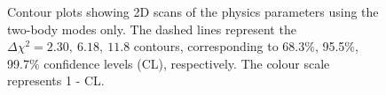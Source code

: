 \begin{figure}[h]
\centering
{}
\caption{Contour plots showing 2D scans of the physics parameters using the two-body modes only. The dashed lines represent the $\Delta \chi^2 = 2.30,\ 6.18,\ 11.8$ contours, corresponding to 68.3\%, 95.5\%, 99.7\% confidence levels (CL), respectively. The colour scale represents 1 - CL.}
\label{gammadiniplots2body}
\end{figure}

